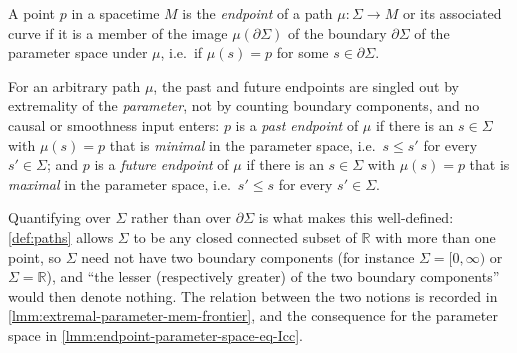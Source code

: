 \begin{definition}[Endpoints]
    \label{def:endpoints}
    \leanok
    A point $p$ in a spacetime $M$ is the \textit{endpoint} of a path $\mu : \Sigma \to M$ or its associated curve if it is a member of the image $\mu(\partial\Sigma)$ of the boundary $\partial\Sigma$ of the parameter space under $\mu$, i.e.\ if $\mu(s) = p$ for some $s \in \partial\Sigma$.

    For an arbitrary path $\mu$, the past and future endpoints are singled out by extremality of the \emph{parameter}, not by counting boundary components, and no causal or smoothness input enters: $p$ is a \textit{past endpoint} of $\mu$ if there is an $s \in \Sigma$ with $\mu(s) = p$ that is \emph{minimal} in the parameter space, i.e.\ $s \le s'$ for every $s' \in \Sigma$; and $p$ is a \textit{future endpoint} of $\mu$ if there is an $s \in \Sigma$ with $\mu(s) = p$ that is \emph{maximal} in the parameter space, i.e.\ $s' \le s$ for every $s' \in \Sigma$.

    Quantifying over $\Sigma$ rather than over $\partial\Sigma$ is what makes this well-defined: \ref{def:paths} allows $\Sigma$ to be any closed connected subset of $\mathbb{R}$ with more than one point, so $\Sigma$ need not have two boundary components (for instance $\Sigma = [0,\infty)$ or $\Sigma = \mathbb{R}$), and ``the lesser (respectively greater) of the two boundary components'' would then denote nothing. The relation between the two notions is recorded in \ref{lmm:extremal-parameter-mem-frontier}, and the consequence for the parameter space in \ref{lmm:endpoint-parameter-space-eq-Icc}.
\end{definition}

